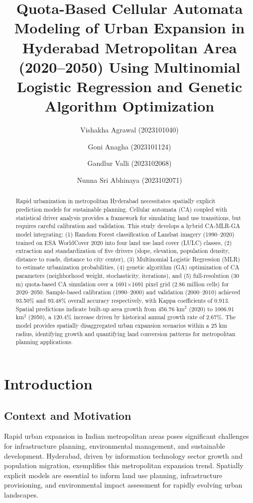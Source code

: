 \documentclass[12pt,a4paper]{article}
\begin{document}
\title{Quota-Based Cellular Automata Modeling of Urban Expansion in Hyderabad Metropolitan Area (2020--2050) Using Multinomial Logistic Regression and Genetic Algorithm Optimization}

\author{
Vishakha Agrawal (2023101040) \and
Goni Anagha (2023101124) \and
Gandlur Valli (2023102068) \and
Nunna Sri Abhinaya (2023102071)
}
\date{}

\maketitle

\begin{abstract}
Rapid urbanization in metropolitan Hyderabad necessitates spatially explicit prediction models for sustainable planning. Cellular automata (CA) coupled with statistical driver analysis provides a framework for simulating land use transitions, but requires careful calibration and validation. This study develops a hybrid CA-MLR-GA model integrating: (1) Random Forest classification of Landsat imagery (1990--2020) trained on ESA WorldCover 2020 into four land use land cover (LULC) classes, (2) extraction and standardization of five drivers (slope, elevation, population density, distance to roads, distance to city center), (3) Multinomial Logistic Regression (MLR) to estimate urbanization probabilities, (4) genetic algorithm (GA) optimization of CA parameters (neighborhood weight, stochasticity, iterations), and (5) full-resolution (30 m) quota-based CA simulation over a 1691$\times$1691 pixel grid (2.86 million cells) for 2020--2050. Sample-based calibration (1990--2000) and validation (2000--2010) achieved 93.50\% and 93.48\% overall accuracy respectively, with Kappa coefficients of 0.913. Spatial predictions indicate built-up area growth from 456.76 km$^2$ (2020) to 1006.91 km$^2$ (2050), a 120.4\% increase driven by historical annual growth rate of 2.67\%. The model provides spatially disaggregated urban expansion scenarios within a 25 km radius, identifying growth and quantifying land conversion patterns for metropolitan planning applications.
\end{abstract}


\section{Introduction}

\subsection{Context and Motivation}
Rapid urban expansion in Indian metropolitan areas poses significant challenges for infrastructure planning, environmental management, and sustainable development. Hyderabad, driven by information technology sector growth and population migration, exemplifies this metropolitan expansion trend. Spatially explicit models are essential to inform land use planning, infrastructure provisioning, and environmental impact assessment for rapidly evolving urban landscapes.
\end{document}
